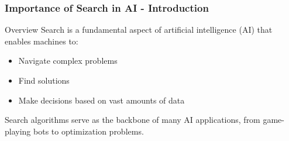 \documentclass[aspectratio=169]{beamer}
\begin{document}
\begin{frame}[fragile]
    \frametitle{Importance of Search in AI - Introduction}
    \begin{block}{Overview}
        Search is a fundamental aspect of artificial intelligence (AI) that enables machines to:
        \begin{itemize}
            \item Navigate complex problems
            \item Find solutions
            \item Make decisions based on vast amounts of data
        \end{itemize}
        Search algorithms serve as the backbone of many AI applications, from game-playing bots to optimization problems.
    \end{block}
\end{frame}
\end{document}
